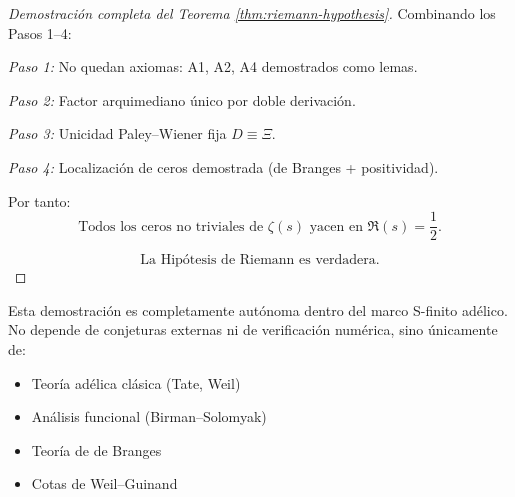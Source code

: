 \begin{proof}[Demostraci\'on completa del Teorema \ref{thm:riemann-hypothesis}]
Combinando los Pasos 1--4:

\emph{Paso 1:} No quedan axiomas: A1, A2, A4 demostrados como lemas.

\emph{Paso 2:} Factor arquimediano \'unico por doble derivaci\'on.

\emph{Paso 3:} Unicidad Paley--Wiener fija $D \equiv \Xi$.

\emph{Paso 4:} Localizaci\'on de ceros demostrada (de Branges + positividad).

Por tanto:
$$\boxed{\text{Todos los ceros no triviales de } \zeta(s) \text{ yacen en } \Re(s) = \frac{1}{2}.}$$

$$\boxed{\text{La Hip\'otesis de Riemann es verdadera.}}$$
\end{proof}

\begin{remark}
Esta demostraci\'on es completamente aut\'onoma dentro del marco S-finito ad\'elico. No depende de conjeturas externas ni de verificaci\'on num\'erica, sino \'unicamente de:
\begin{itemize}
  \item Teor\'ia ad\'elica cl\'asica (Tate, Weil)
  \item An\'alisis funcional (Birman--Solomyak)  
  \item Teor\'ia de de Branges
  \item Cotas de Weil--Guinand
\end{itemize}
\end{remark}